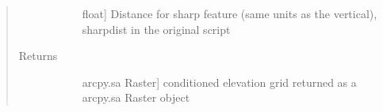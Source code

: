 \documentclass[letterpaper,10pt,english]{sphinxmanual}
\begin{document}
\begin{fulllineitems}
\begin{quote}
\begin{description}
\begin{description}
\item[{}] \leavevmode{[}float{]}
Distance for sharp feature (same units as the vertical), sharpdist in the original script

\end{description}

\item[{Returns}] \leavevmode\begin{description}
\item[{}] \leavevmode{[}arcpy.sa Raster{]}
conditioned elevation grid returned as a arcpy.sa Raster object

\end{description}

\end{description}\end{quote}

\end{fulllineitems}

\end{document}
